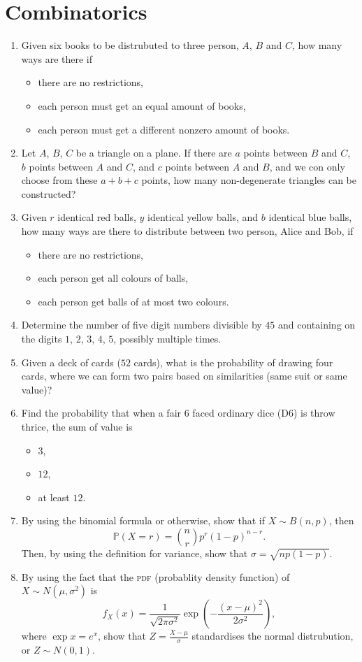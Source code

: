 \documentclass{article}
\begin{document}
\section{Combinatorics}
\begin{enumerate}
\item Given six books to be distrubuted to three person, $A$, $B$ and $C$, how many ways are there if
       \begin{itemize}
              \item[(a)] there are no restrictions,
              \item[(b)] each person must get an equal amount of books,
              \item[(c)] each person must get a different nonzero amount of books.
       \end{itemize}
\item Let $A$, $B$, $C$ be a triangle on a plane. If there are $a$ points between $B$ and $C$, $b$ points between $A$ and $C$, and $c$ points between $A$ and $B$, and we con only choose from these $a+b+c$ points, how many non-degenerate triangles can be constructed?
\item Given $r$ identical red balls, $y$ identical yellow balls, and $b$ identical blue balls, how many ways are there to distribute between two person, Alice and Bob, if
       \begin{itemize}
              \item[(a)] there are no restrictions,
              \item[(b)] each person get all colours of balls,
              \item[(c)] each person get balls of at most two colours.
       \end{itemize}
\item Determine the number of five digit numbers divisible by $45$ and containing on the digits $1$, $2$, $3$, $4$, $5$, possibly multiple times.
\item Given a deck of cards ($52$ cards), what is the probability of drawing four cards, where we can form two pairs based on similarities (same suit or same value)?
\item Find the probability that when a fair $6$ faced ordinary dice (D6) is throw thrice, the sum of value is
       \begin{itemize}
              \item[(a)] $3$,
              \item[(b)] $12$,
              \item[(c)] at least $12$.
       \end{itemize}
\item By using the binomial formula or otherwise, show that if $X\sim B(n,p)$, then \[\mathbb{P}(X=r)=\binom{n}{r}p^r(1-p)^{n-r}.\]Then, by using the definition for variance, show that $\sigma=\sqrt{np(1-p)}$.
\item By using the fact that the \textsc{pdf} (probablity density function) of $X\sim N(\mu,\sigma^2)$ is \[f_X(x)={\frac {1}{\sqrt {2\pi \sigma ^{2}}}}\exp {\left(-{\frac {(x-\mu )^{2}}{2\sigma ^{2}}}\right)},\]where $\exp x=e^x$, show that $\displaystyle Z=\frac{X-\mu}{\sigma}$ standardises the normal distrubution, or $Z\sim N(0,1)$.
\end{enumerate}
\end{document}
